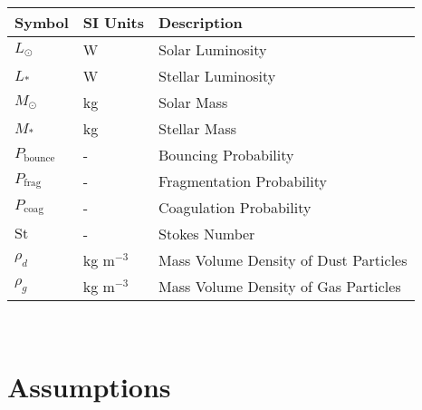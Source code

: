    \begin{table}[h!]
        \begin{tabular}{|l|l|l|}
            \hline
            \textbf{Symbol}     & \textbf{SI Units}     & \textbf{Description}
            \\ \hline
            $L_\odot$           & W                     & Solar Luminosity 
            \\ \hline
            $L_*$               & W                     & Stellar Luminosity 
            \\ \hline
            $M_\odot$           & kg                    & Solar Mass 
            \\ \hline
            $M_*$               & kg                    & Stellar Mass 
            \\ \hline
            $P_\text{bounce}$   & -                     & Bouncing Probability
            \\ \hline
            $P_\text{frag}$     & -                     & Fragmentation Probability
            \\ \hline
            $P_\text{coag}$     & -                     & Coagulation Probability
            \\ \hline
            $\text{St}$         & -                     & Stokes Number 
            \\ \hline
            $\rho_d$            & kg m$^{-3}$           & Mass Volume Density of Dust Particles 
            \\ \hline
            $\rho_g$            & kg m$^{-3}$           & Mass Volume Density of Gas Particles 
            \\ \hline
        \end{tabular}
    \end{table} \ \\ 
    
\section{Assumptions}

